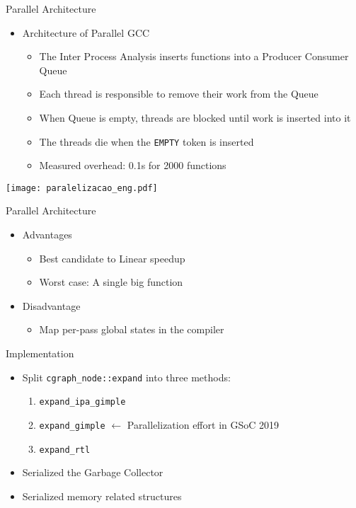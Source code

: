 \begin{frame}{Parallel Architecture}
    \begin{itemize}
        \item Architecture of Parallel GCC
            \begin{itemize}
                \item The Inter Process Analysis inserts functions into a Producer Consumer Queue
                \item Each thread is responsible to remove their work from the Queue
                \item When Queue is empty, threads are blocked until work is inserted into it
                \item The threads die when the \texttt{EMPTY} token is inserted
                \item Measured overhead: 0.1s for 2000 functions
             \end{itemize}
\end{itemize}
 \centering
 \texttt{[image: paralelizacao\_eng.pdf]}
\end{frame}

\begin{frame}{Parallel Architecture}
    \begin{itemize}
        \item Advantages
            \begin{itemize}
                \item Best candidate to Linear speedup
                \item Worst case: A single big function
            \end{itemize}
        \item Disadvantage
            \begin{itemize}
              \item Map per-pass global states in the compiler
            \end{itemize}
    \end{itemize}
\end{frame}

\begin{frame}{Implementation}
    \begin{itemize}
        \item Split \texttt{cgraph\_node::expand} into three methods:
            \begin{enumerate}
                \item \texttt{expand\_ipa\_gimple}
                \item \texttt{expand\_gimple} $\longleftarrow$ Parallelization effort in GSoC 2019
                \item \texttt{expand\_rtl}
            \end{enumerate}
        \item Serialized the Garbage Collector
        \item Serialized memory related structures
    \end{itemize}
\end{frame}

